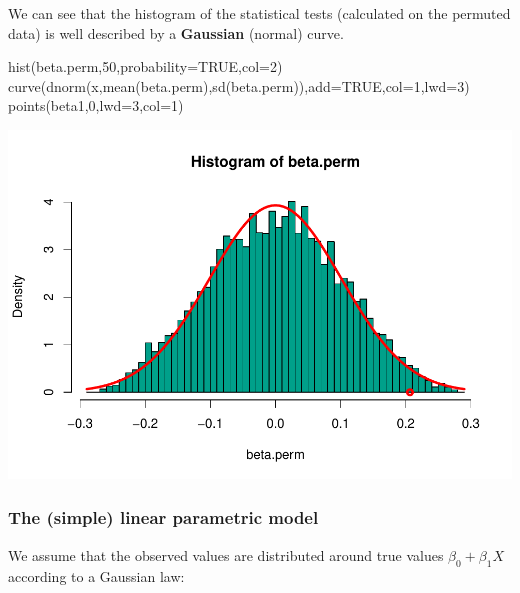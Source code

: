 \documentclass[
]{article}
\newenvironment{Shaded}{\begin{snugshade}}{\end{snugshade}}
\newcommand{\AttributeTok}[1]{\textcolor[rgb]{0.77,0.63,0.00}{#1}}
\newcommand{\ConstantTok}[1]{\textcolor[rgb]{0.00,0.00,0.00}{#1}}
\newcommand{\DecValTok}[1]{\textcolor[rgb]{0.00,0.00,0.81}{#1}}
\newcommand{\FunctionTok}[1]{\textcolor[rgb]{0.00,0.00,0.00}{#1}}
\newcommand{\NormalTok}[1]{#1}
\begin{document}
We can see that the histogram of the statistical tests (calculated on
the permuted data) is well described by a \textbf{Gaussian }(normal)
curve.

\begin{Shaded}
\begin{Highlighting}[]
\FunctionTok{hist}\NormalTok{(beta.perm,}\DecValTok{50}\NormalTok{,}\AttributeTok{probability=}\ConstantTok{TRUE}\NormalTok{,}\AttributeTok{col=}\DecValTok{2}\NormalTok{)}
\FunctionTok{curve}\NormalTok{(}\FunctionTok{dnorm}\NormalTok{(x,}\FunctionTok{mean}\NormalTok{(beta.perm),}\FunctionTok{sd}\NormalTok{(beta.perm)),}\AttributeTok{add=}\ConstantTok{TRUE}\NormalTok{,}\AttributeTok{col=}\DecValTok{1}\NormalTok{,}\AttributeTok{lwd=}\DecValTok{3}\NormalTok{)}
\FunctionTok{points}\NormalTok{(beta1,}\DecValTok{0}\NormalTok{,}\AttributeTok{lwd=}\DecValTok{3}\NormalTok{,}\AttributeTok{col=}\DecValTok{1}\NormalTok{)}
\end{Highlighting}
\end{Shaded}

\begin{center}\includegraphics{perm_files/figure-latex/unnamed-chunk-17-1} \end{center}

\hypertarget{the-simple-linear-parametric-model}{%
\subsubsection{The (simple) linear parametric
model}\label{the-simple-linear-parametric-model}}

We assume that the observed values are distributed around true values
\(\beta_0 + \beta_1 X\) according to a Gaussian law:
\end{document}
